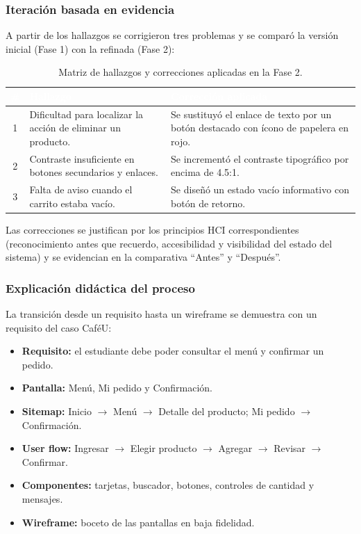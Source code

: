 \documentclass{article}
\begin{document}
\subsubsection{Iteración basada en evidencia}
A partir de los hallazgos se corrigieron tres problemas y se comparó la versión inicial (Fase 1) con la refinada (Fase 2):

\begin{table}[H]
\centering
\renewcommand{\arraystretch}{1.4}
\begin{tabularx}{\textwidth}{|c|X|X|}
\hline
\rowcolor{headerblue}
\textcolor{white}{\textbf{\#}} & \textcolor{white}{\textbf{Hallazgo}} & \textcolor{white}{\textbf{Corrección aplicada}} \\ \hline
1 & Dificultad para localizar la acción de eliminar un producto. & Se sustituyó el enlace de texto por un botón destacado con ícono de papelera en rojo. \\ \hline
2 & Contraste insuficiente en botones secundarios y enlaces. & Se incrementó el contraste tipográfico por encima de 4.5:1. \\ \hline
3 & Falta de aviso cuando el carrito estaba vacío. & Se diseñó un estado vacío informativo con botón de retorno. \\ \hline
\end{tabularx}
\caption{Matriz de hallazgos y correcciones aplicadas en la Fase 2.}
\end{table}

Las correcciones se justifican por los principios HCI correspondientes (reconocimiento antes que recuerdo, accesibilidad y visibilidad del estado del sistema) y se evidencian en la comparativa ``Antes'' y ``Después''.

\subsubsection{Explicación didáctica del proceso}
La transición desde un requisito hasta un wireframe se demuestra con un requisito del caso CaféU:
\begin{itemize}[leftmargin=1.5em, itemsep=3pt]
    \item \textbf{Requisito:} el estudiante debe poder consultar el menú y confirmar un pedido.
    \item \textbf{Pantalla:} Menú, Mi pedido y Confirmación.
    \item \textbf{Sitemap:} Inicio $\rightarrow$ Menú $\rightarrow$ Detalle del producto; Mi pedido $\rightarrow$ Confirmación.
    \item \textbf{User flow:} Ingresar $\rightarrow$ Elegir producto $\rightarrow$ Agregar $\rightarrow$ Revisar $\rightarrow$ Confirmar.
    \item \textbf{Componentes:} tarjetas, buscador, botones, controles de cantidad y mensajes.
    \item \textbf{Wireframe:} boceto de las pantallas en baja fidelidad.
\end{itemize}
\end{document}
